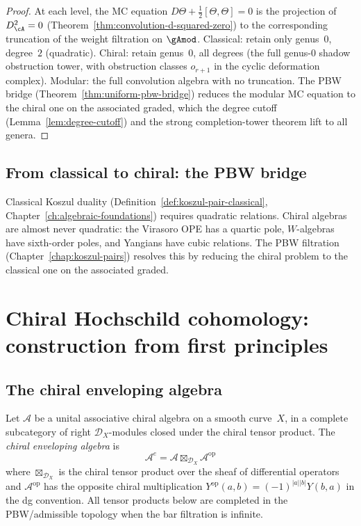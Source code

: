 \begin{proof}
At each level, the MC equation $D\Theta + \tfrac{1}{2}[\Theta,\Theta] = 0$ is the projection of $D_\cA^2 = 0$ (Theorem~\ref{thm:convolution-d-squared-zero}) to the corresponding truncation of the weight filtration on $\gAmod$.
Classical: retain only genus~$0$, degree~$2$ (quadratic).
Chiral: retain genus~$0$, all degrees (the full genus-$0$ shadow obstruction tower, with obstruction classes $o_{r+1}$ in the cyclic deformation complex).
Modular: the full convolution algebra with no truncation.
The PBW bridge (Theorem~\ref{thm:uniform-pbw-bridge}) reduces the modular MC equation to the chiral one on the associated graded, which the degree cutoff (Lemma~\ref{lem:degree-cutoff}) and the strong completion-tower theorem lift to all genera.
\end{proof}

\subsection{From classical to chiral: the PBW bridge}

Classical Koszul duality (Definition~\ref{def:koszul-pair-classical}, Chapter~\ref{ch:algebraic-foundations}) requires quadratic relations. Chiral algebras are almost never quadratic: the Virasoro OPE has a quartic pole, $W$-algebras have sixth-order poles, and Yangians have cubic relations. The PBW filtration (Chapter~\ref{chap:koszul-pairs}) resolves this by reducing the chiral problem to the classical one on the associated graded.


\section{Chiral Hochschild cohomology: construction from first principles}

\subsection{The chiral enveloping algebra}

\begin{definition}
Let $\mathcal{A}$ be a unital associative chiral algebra on a smooth
curve~$X$, in a complete subcategory of right $\mathcal D_X$-modules
closed under the chiral tensor product.  The \emph{chiral enveloping
algebra} is
\[
\mathcal{A}^e = \mathcal{A} \boxtimes_{\mathcal{D}_X} \mathcal{A}^{\text{op}}
\]
where $\boxtimes_{\mathcal{D}_X}$ is the chiral tensor product over
the sheaf of differential operators and $\mathcal{A}^{\text{op}}$
has the opposite chiral multiplication
$Y^{\text{op}}(a,b)=(-1)^{|a||b|}Y(b,a)$ in the dg convention.
All tensor products below are completed in the PBW/admissible
topology when the bar filtration is infinite.
\end{definition}

